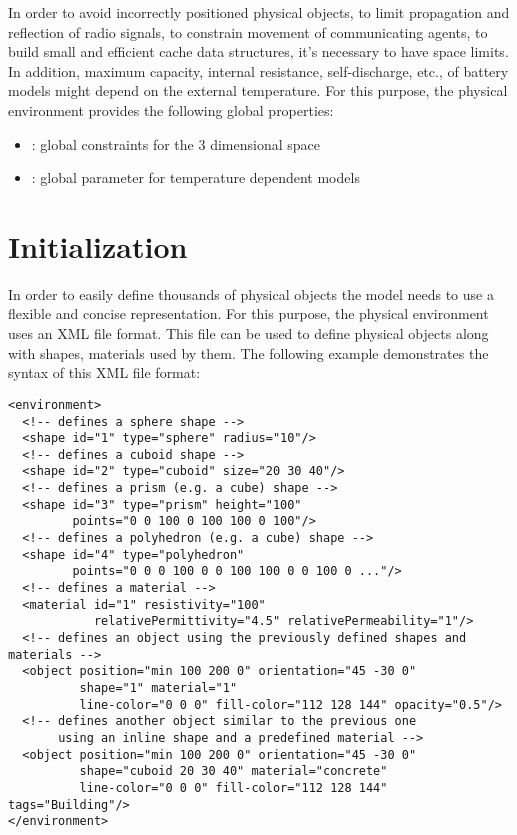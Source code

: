 In order to avoid incorrectly positioned physical objects, to limit propagation
and reflection of radio signals, to constrain movement of communicating agents,
to build small and efficient cache data structures, it's necessary to have space
limits. In addition, maximum capacity, internal resistance, self-discharge, etc.,
of battery models might depend on the external temperature. For this purpose,
the  physical environment provides the following global properties:

\begin{itemize}
  \item {}: global constraints for the 3 dimensional space
  \item {}: global parameter for temperature dependent models 
\end{itemize}

\section{Initialization}

In order to easily define thousands of physical objects the model needs to use a
flexible and concise representation. For this purpose, the physical environment
uses an XML file format. This file can be used to define physical objects along
with shapes, materials used by them. The following example demonstrates the
syntax of this XML file format:

\begin{verbatim}
<environment>
  <!-- defines a sphere shape -->
  <shape id="1" type="sphere" radius="10"/>
  <!-- defines a cuboid shape -->
  <shape id="2" type="cuboid" size="20 30 40"/>
  <!-- defines a prism (e.g. a cube) shape -->
  <shape id="3" type="prism" height="100"
         points="0 0 100 0 100 100 0 100"/>
  <!-- defines a polyhedron (e.g. a cube) shape -->
  <shape id="4" type="polyhedron"
         points="0 0 0 100 0 0 100 100 0 0 100 0 ..."/>
  <!-- defines a material -->
  <material id="1" resistivity="100"
            relativePermittivity="4.5" relativePermeability="1"/>
  <!-- defines an object using the previously defined shapes and materials -->
  <object position="min 100 200 0" orientation="45 -30 0"
          shape="1" material="1"
          line-color="0 0 0" fill-color="112 128 144" opacity="0.5"/>
  <!-- defines another object similar to the previous one
       using an inline shape and a predefined material -->
  <object position="min 100 200 0" orientation="45 -30 0"
          shape="cuboid 20 30 40" material="concrete"
          line-color="0 0 0" fill-color="112 128 144" tags="Building"/>
</environment>          
\end{verbatim}

